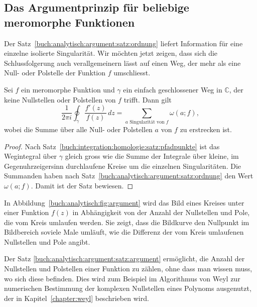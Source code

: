 %
%
%
\subsection{Das Argumentprinzip für beliebige meromorphe Funktionen}
%
Der Satz~\ref{buch:analytisch:argument:satz:ordnung}
liefert Information für eine einzelne isolierte Singularität.
Wir möchten jetzt zeigen, dass sich die Schlussfolgerung auch
verallgemeinern lässt auf einen Weg, der mehr als eine Null-
oder Polstelle der Funktion $f$ umschliesst.

\begin{satz}
\label{buch:analytisch:argument:satz:argument}
%
%
Sei $f$ ein meromorphe Funktion und $\gamma$ ein einfach
geschlossener Weg in $\mathbb{C}$, der keine Nullstellen oder Polstellen
von $f$ trifft.
Dann gilt
\[
\frac{1}{2\pi i}
\oint_\gamma
\frac{f'(z)}{f(z)}
\,dz
=
\sum_{\text{$a$ Singularität von $f$}}
\omega(a;f),
\]
wobei die Summe über alle Null- oder Polstellen $a$ von $f$ 
zu erstrecken ist.
\end{satz}

\begin{proof}
Nach Satz~\ref{buch:integration:homologie:satz:pfadpunkte} ist das
Wegintegral über $\gamma$ gleich gross wie die Summe der Integrale
über kleine, im Gegenuhrzeigersinn durchlaufene Kreise um die einzelnen
Singularitäten.
Die Summanden haben nach
Satz~\ref{buch:analytisch:argument:satz:ordnung}
den Wert $\omega(a;f)$.
Damit ist der Satz bewiesen.
\end{proof}

In Abbildung~\ref{buch:analytisch:fig:argument}
wird das Bild eines Kreises unter einer Funktion $f(z)$ in Abhängigkeit
von der Anzahl der Nullstellen und Pole, die vom Kreis umlaufen werden.
Sie zeigt, dass die Bildkurve den Nullpunkt im Bildbereich soviele
Male umläuft, wie die Differenz der vom Kreis umlaufenen Nullstellen und
Pole angibt.

Der Satz \ref{buch:analytisch:argument:satz:argument} ermöglicht,
die Anzahl der Nullstellen und Polstellen einer Funktion zu zählen,
ohne dass man wissen muss, wo sich diese befinden.
Dies wird zum Beispiel im Algorithmus von Weyl zur numerischen
Bestimmung der komplexen Nullstellen eines Polynoms ausgenutzt, der in
Kapitel~\ref{chapter:weyl} beschrieben wird.


